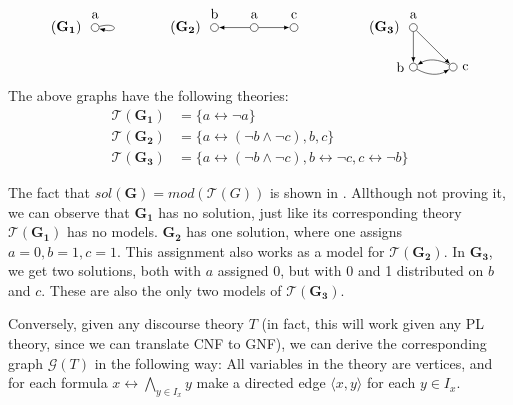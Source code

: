 \begin{example}\label{ex:3graphs}
  \[
    \begin{tikzpicture}
      [
      point/.style={circle,draw,inner sep=0pt,minimum size=2mm},
      collection/.style={thick,rectangle,draw,inner sep=0pt,minimum height=14mm, minimum width= 9mm}
      ]
      \node (label) at (0,1) [label=left:$(\mathbf{G_1})\;$] {};
      \node (0) at (0,1) [point,label=above:a] {};
      \draw [-latex, loop right] (0) to (0);

      \node (label) at (3,1) [label=left:$(\mathbf{G_2})\;$] {};
      \node (0) at (4,1) [point,label=above:a] {};
      \node (1) at (3,1) [point,label=above:b] {};
      \node (2) at (5,1) [point,label=above:c] {};
      \draw [-latex] (0) to (1);
      \draw [-latex] (0) to (2);

      \node (label) at (8,1) [label=left:$(\mathbf{G_3})\;$] {};
      \node (0) at (8,1) [point,label=above:a] {};
      \node (1) at (8,0) [point,label=left:b] {};
      \node (2) at (9,0) [point,label=right:c] {};
      \draw [-latex] (0) to (2);
      \draw [-latex] (0) to (1);
      \draw [-latex, bend right] (1) to (2);
      \draw [-latex, bend right] (2) to (1);
    \end{tikzpicture}
  \]
  The above graphs have the following theories:
  \begin{align}
    \mathcal{T}(\mathbf{G_1}) &= \big \{ a \leftrightarrow \neg a \big \} \\
    \mathcal{T}(\mathbf{G_2}) &= \big \{ a \leftrightarrow (\neg b \wedge \neg c), b, c \big \}\\
    \mathcal{T}(\mathbf{G_3}) &= \big \{ a \leftrightarrow (\neg b \wedge \neg c), b \leftrightarrow \neg c, c \leftrightarrow \neg b \big \}
  \end{align}

\end{example}
The fact that $sol(\mathbf{G}) = mod(\mathcal{T}(G))$ is shown in \cite{apal-digraph}.
Allthough not proving it, we can observe that $\mathbf{G_1}$ has no solution, just like its corresponding theory $\mathcal{T}(\mathbf{G_1})$ has no models.
$\mathbf{G_2}$ has one solution, where one assigns $a=0, b=1, c=1$.
This assignment also works as a model for $\mathcal{T}(\mathbf{G_2})$.
In $\mathbf{G_3}$, we get two solutions, both with $a$ assigned 0, but with 0 and 1 distributed on $b$ and $c$.
These are also the only two models of $\mathcal{T}(\mathbf{G_3})$.

Conversely, given any discourse theory $T$ (in fact, this will work given any PL theory, since we can translate CNF to GNF), we can derive the corresponding graph $\mathcal{G}(T)$ in the following way:
All variables in the theory are vertices, and for each formula $x \leftrightarrow \bigwedge_{y \in I_x} y$ make a directed edge $\langle x,y \rangle$ for each $y \in I_x$.\\

